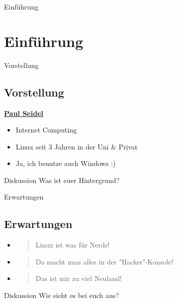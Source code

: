 
\begin{frame}{Einführung}
    \section{Einführung}\label{sec:einfuhrung}
\end{frame}

\begin{frame}{Vorstellung}
    \subsection{Vorstellung}\label{subsec:vorstellung}

    \underline{\textbf{Paul Seidel}}

    \begin{itemize}
        \item Internet Computing
        \item Linux seit 3 Jahren in der Uni \& Privat
        \item Ja, ich benutze auch Windows :)
    \end{itemize}

    \pause
    \vspace{0.5cm}
    \begin{alertblock}{Diskussion}
        Was ist euer Hintergrund?
    \end{alertblock}

\end{frame}

\begin{frame}{Erwartungen}
    \subsection{Erwartungen}\label{subsec:erwartungen}

    \begin{itemize}
        \item \begin{quote}
                  Linux ist was für Nerds!
        \end{quote}\pause
        \item \begin{quote}
                  Da macht man alles in der "Hacker"-Konsole!
        \end{quote}\pause
        \item \begin{quote}
                  Das ist mir zu viel Neuland!
        \end{quote}
    \end{itemize}

    \pause
    \vspace{0.5cm}
    \begin{alertblock}{Diskussion}
        Wie sieht es bei euch aus?
    \end{alertblock}

\end{frame}


